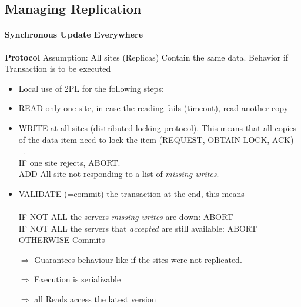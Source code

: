\documentclass[a4paper,12pt]{article}%
\begin{document}
 
 
 
 
 
 
 
 
 
 
 
 
 
 
 
 
 
 \subsection{Managing Replication}
 \paragraph{Synchronous Update Everywhere}
 
 {\bf Protocol}
 Assumption: All sites (Replicas) Contain the same data. Behavior if Transaction is to be executed
 \begin{itemize}
  \item Local use of 2PL for the following steps:
  \item READ only one site, in case the reading fails (timeout), read another copy
  \item WRITE at all sites (distributed locking protocol). This means that all copies of the data item need to lock the item (REQUEST, OBTAIN LOCK, ACK)\\~. \\
  IF one site rejects, ABORT. \\
  ADD All site not responding to a list of {\it missing writes}.
  \item VALIDATE (=commit) the transaction at the end, this means\\~ \\ 
  IF NOT ALL the servers {\it missing writes} are down: ABORT \\
  IF NOT ALL the servers that {\it accepted} are still available: ABORT \\
  OTHERWISE Commits
 \end{itemize}

 
 
 \begin{itemize}
  \item[$\Rightarrow$] Guarantees behaviour like if the sites were not replicated.
  \item[$\Rightarrow$]  Execution is serializable
  \item[$\Rightarrow$]  all Reads access the latest version
 \end{itemize}
\end{document}
